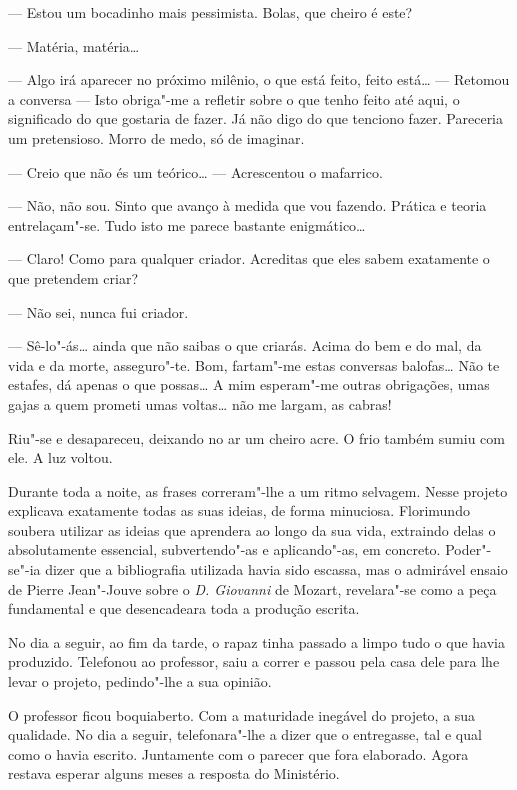--- Estou um bocadinho mais pessimista. Bolas, que cheiro é este?

--- Matéria, matéria\ldots{}

--- Algo irá aparecer no próximo milênio, o que está feito, feito está\ldots{}
---  Retomou a conversa --- Isto obriga"-me a refletir sobre o que tenho
feito até aqui, o significado do que gostaria de fazer. Já não digo do
que tenciono fazer. Pareceria um pretensioso. Morro de medo, só de
imaginar.

--- Creio que não és um teórico\ldots{} --- Acrescentou o mafarrico.

--- Não, não sou. Sinto que avanço à medida que vou fazendo. Prática e
teoria entrelaçam"-se. Tudo isto me parece bastante enigmático\ldots{}

--- Claro! Como para qualquer criador. Acreditas que eles sabem
exatamente o que pretendem criar?

--- Não sei, nunca fui criador.

--- Sê-lo"-ás\ldots{} ainda que não saibas o que criarás. Acima do bem e do mal,
da vida e da morte, asseguro"-te. Bom, fartam"-me estas conversas
balofas\ldots{} Não te estafes, dá apenas o que possas\ldots{} A mim esperam"-me
outras obrigações, umas gajas a quem prometi umas voltas\ldots{} não me
largam, as cabras!

Riu"-se e desapareceu, deixando no ar um cheiro acre. O frio também sumiu
com ele. A luz voltou.

Durante toda a noite, as frases correram"-lhe a um ritmo selvagem. Nesse
projeto explicava exatamente todas as suas ideias, de forma minuciosa.
Florimundo soubera utilizar as ideias que aprendera ao longo da sua
vida, extraindo delas o absolutamente essencial, subvertendo"-as e
aplicando"-as, em concreto. Poder"-se"-ia dizer que a bibliografia
utilizada havia sido escassa, mas o admirável ensaio de Pierre
Jean"-Jouve sobre o \emph{D. Giovanni} de Mozart, revelara"-se como a peça
fundamental e que desencadeara toda a produção escrita.

No dia a seguir, ao fim da tarde, o rapaz tinha passado a limpo tudo o
que havia produzido. Telefonou ao professor, saiu a correr e passou pela
casa dele para lhe levar o projeto, pedindo"-lhe a sua opinião.

O professor ficou boquiaberto. Com a maturidade inegável do projeto, a
sua qualidade. No dia a seguir, telefonara"-lhe a dizer que o entregasse,
tal e qual como o havia escrito. Juntamente com o parecer que fora
elaborado. Agora restava esperar alguns meses a resposta do Ministério.


